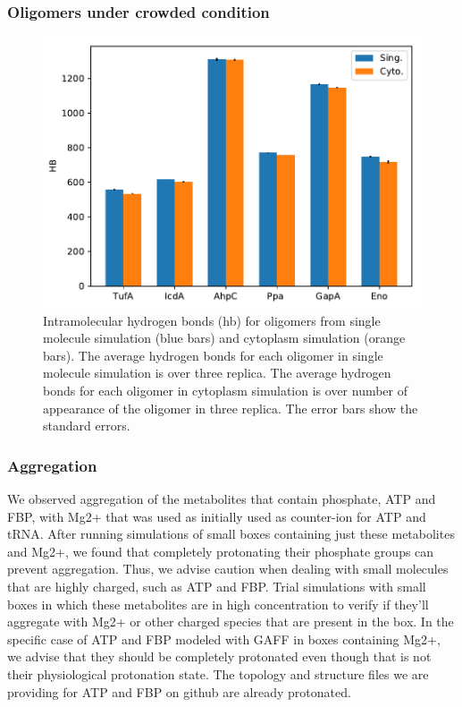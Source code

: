 \documentclass[journal=jacsat,manuscript=article]{achemso}
\begin{document}
\subsubsection{Oligomers under crowded condition}
\begin{figure}
\includegraphics[scale=0.6]{hb.pdf}
\caption{Intramolecular hydrogen bonds (hb) for oligomers from single molecule simulation (blue bars) and cytoplasm simulation (orange bars). The average hydrogen bonds for each oligomer in single molecule simulation is over three replica. The average hydrogen bonds for each oligomer in cytoplasm simulation is over number of appearance of the oligomer in three replica. The error bars show the standard errors.}
\end{figure}


\subsubsection{Aggregation}
We observed aggregation of the metabolites that contain phosphate, ATP and FBP, with Mg2+ that was used as initially used as counter-ion for ATP and tRNA. After running simulations of small boxes containing just these metabolites and Mg2+, we found that completely protonating their phosphate groups can prevent aggregation. Thus, we advise caution when dealing with small molecules that are highly charged, such as ATP and FBP. Trial simulations with small boxes in which these metabolites are in high concentration to verify if they'll aggregate with Mg2+ or other charged species that are present in the box. In the specific case of ATP and FBP modeled with GAFF in boxes containing Mg2+, we advise that they should be completely protonated even though that is not their physiological protonation state. The topology and structure files we are providing for ATP and FBP on github are already protonated.
\end{document}
